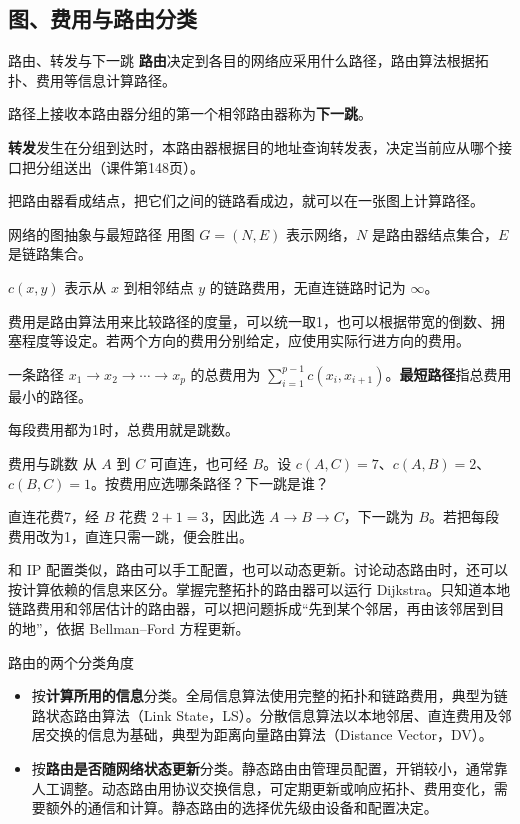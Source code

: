 \subsection{图、费用与路由分类}

\begin{definition}{路由、转发与下一跳}
\textbf{路由}决定到各目的网络应采用什么路径，路由算法根据拓扑、费用等信息计算路径。

路径上接收本路由器分组的第一个相邻路由器称为\textbf{下一跳}。

\textbf{转发}发生在分组到达时，本路由器根据目的地址查询转发表，决定当前应从哪个接口把分组送出（课件第148页）。
\end{definition}

把路由器看成结点，把它们之间的链路看成边，就可以在一张图上计算路径。

\begin{definition}{网络的图抽象与最短路径}
用图 $G=(N,E)$ 表示网络，$N$ 是路由器结点集合，$E$ 是链路集合。

$c(x,y)$ 表示从 $x$ 到相邻结点 $y$ 的链路费用，无直连链路时记为 $\infty$。

费用是路由算法用来比较路径的度量，可以统一取1，也可以根据带宽的倒数、拥塞程度等设定。若两个方向的费用分别给定，应使用实际行进方向的费用。

一条路径 $x_1\to x_2\to\cdots\to x_p$ 的总费用为 $\sum_{i=1}^{p-1} c(x_i,x_{i+1})$。\textbf{最短路径}指总费用最小的路径。
\end{definition}

\begin{remark}
每段费用都为1时，总费用就是跳数。
\end{remark}

\begin{example}{费用与跳数}
从 $A$ 到 $C$ 可直连，也可经 $B$。设 $c(A,C)=7$、$c(A,B)=2$、$c(B,C)=1$。按费用应选哪条路径？下一跳是谁？
\end{example}
\begin{solution}
直连花费7，经 $B$ 花费 $2+1=3$，因此选 $A\to B\to C$，下一跳为 $B$。若把每段费用改为1，直连只需一跳，便会胜出。
\end{solution}

和 IP 配置类似，路由可以手工配置，也可以动态更新。讨论动态路由时，还可以按计算依赖的信息来区分。掌握完整拓扑的路由器可以运行 Dijkstra。只知道本地链路费用和邻居估计的路由器，可以把问题拆成“先到某个邻居，再由该邻居到目的地”，依据 Bellman--Ford 方程更新。

\begin{proposition}{路由的两个分类角度}
\begin{itemize}[nosep]
  \item 按\textbf{计算所用的信息}分类。全局信息算法使用完整的拓扑和链路费用，典型为链路状态路由算法（Link State，LS）。分散信息算法以本地邻居、直连费用及邻居交换的信息为基础，典型为距离向量路由算法（Distance Vector，DV）。
  \item 按\textbf{路由是否随网络状态更新}分类。静态路由由管理员配置，开销较小，通常靠人工调整。动态路由用协议交换信息，可定期更新或响应拓扑、费用变化，需要额外的通信和计算。静态路由的选择优先级由设备和配置决定。
\end{itemize}
\end{proposition}

